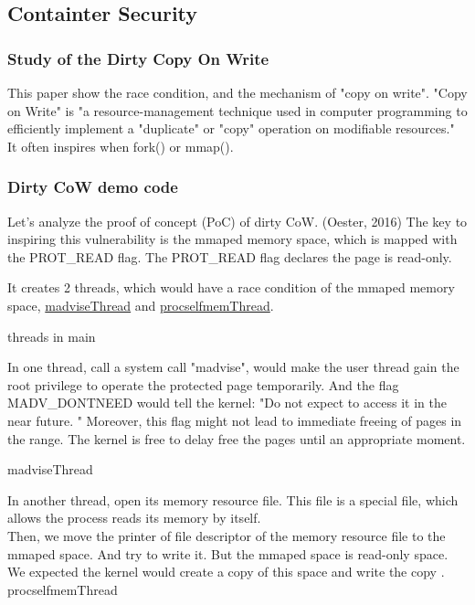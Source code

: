 \documentclass[12pt,a4paper]{article}
\begin{document}
\subsection{Containter Security}
\hypertarget{security}{}
\subsubsection{Study of the Dirty Copy On Write}
This paper \cite{Study_Dirty_Cow} show the race condition, and the mechanism of
"copy on write". "Copy on Write" is "a resource-management technique used in
computer programming to efficiently implement a "duplicate" or "copy" operation
on modifiable resources." \cite{CoW_wiki} It often inspires when fork() or mmap().

\subsubsection{Dirty CoW demo code}
Let's analyze the proof of concept (PoC) of dirty CoW. (Oester, 2016) \cite{Dirty_CoW}
The key to inspiring this vulnerability is the mmaped memory space, which is mapped with
the PROT\_READ flag. The PROT\_READ flag declares the page is read-only.


It creates 2 threads, which would have a race condition of the mmaped memory space,
\hyperlink{madvise}{madviseThread} and \hyperlink{procself}{procselfmemThread}.

\hypertarget{threads_main}{threads in main}


In one thread, call a system call "madvise", would make the user thread gain the root
privilege to operate the protected page temporarily. And the flag MADV\_DONTNEED would
tell the kernel: "Do not expect to access it in the near future. \cite{Madvise}" Moreover,
this flag might not lead to immediate freeing of pages in the range. The kernel is free
to delay free the pages until an appropriate moment. \cite{Madvise}

\hypertarget{madvise}{madviseThread}


In another thread, open its memory resource file. This file is a special file, which allows
the process reads its memory by itself.\\
Then, we move the printer of file descriptor of the memory resource file to the mmaped
space. And try to write it. But the mmaped space is read-only space. We expected the
kernel would create a copy of this space and write the copy \cite{root_exploit}.\\
\hypertarget{procself}{procselfmemThread}

\end{document}
